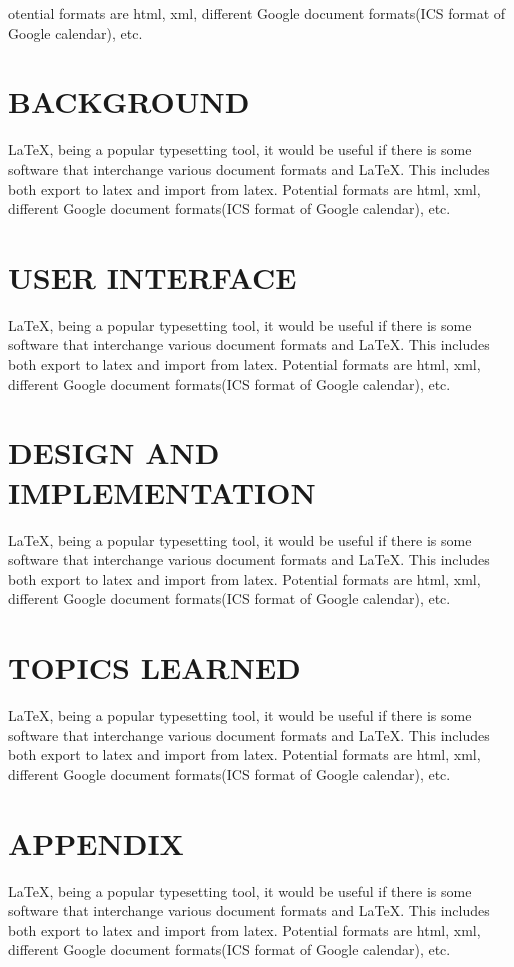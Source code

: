 \documentclass[a4paper,10pt]{mesreport}
\begin{document}
otential formats are html, xml, different Google document formats(ICS format of Google calendar), etc.

\chapter{BACKGROUND}
LaTeX, being a popular typesetting tool, it would be useful if there is some software that interchange
various document formats and LaTeX. This includes both export to latex and import from latex.
Potential formats are html, xml, different Google document formats(ICS format of Google calendar), etc.

\chapter{USER INTERFACE}
LaTeX, being a popular typesetting tool, it would be useful if there is some software that interchange
various document formats and LaTeX. This includes both export to latex and import from latex.
Potential formats are html, xml, different Google document formats(ICS format of Google calendar), etc.

\chapter{DESIGN AND IMPLEMENTATION}

LaTeX, being a popular typesetting tool, it would be useful if there is some software that interchange
various document formats and LaTeX. This includes both export to latex and import from latex.
Potential formats are html, xml, different Google document formats(ICS format of Google calendar), etc.

\chapter{TOPICS LEARNED}
LaTeX, being a popular typesetting tool, it would be useful if there is some software that interchange
various document formats and LaTeX. This includes both export to latex and import from latex.
Potential formats are html, xml, different Google document formats(ICS format of Google calendar), etc.

\chapter{APPENDIX}
LaTeX, being a popular typesetting tool, it would be useful if there is some software that interchange
various document formats and LaTeX. This includes both export to latex and import from latex.
Potential formats are html, xml, different Google document formats(ICS format of Google calendar), etc.
\end{document}
